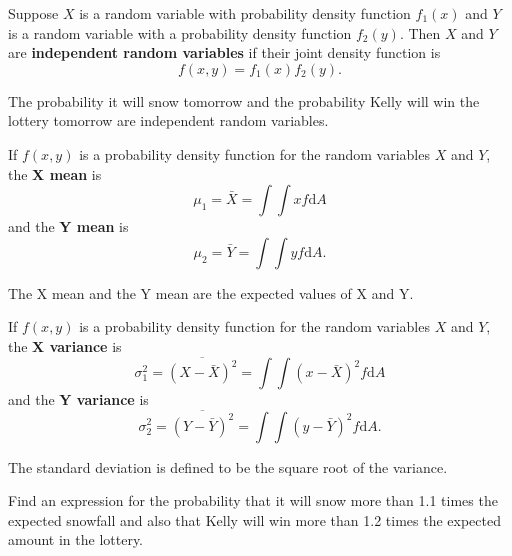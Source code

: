 \begin{definition} Suppose $X$ is a random variable with probability density function $f_1(x)$ and $Y$ is a random variable with a probability density function $f_2(y)$. Then $X$ and $Y$ are {\bf independent random variables} if their joint density function is
$$f(x,y)=f_1(x)f_2(y).$$
\end{definition}

\begin{example} The probability it will snow tomorrow and the probability Kelly will win the lottery tomorrow are independent random variables.
\end{example}

\begin{definition} If $f(x,y)$ is a probability density function for the random variables $X$ and $Y$, the {\bf X mean} is
$$\mu_1=\bar{X}=\int\int xf\mathrm{d}A$$
and the {\bf Y mean} is
$$\mu_2=\bar{Y}=\int\int yf\mathrm{d}A.$$
\end{definition}

\begin{remark} The X mean and the Y mean are the expected values of X and Y.
\end{remark}

\begin{definition} If $f(x,y)$ is a probability density function for the random variables $X$ and $Y$, the {\bf X variance} is
$$\sigma_1^2=\overline{(X-\bar{X})^2}=\int\int (x-\bar{X})^2f\mathrm{d}A$$
and the {\bf Y variance} is
$$\sigma_2^2=\overline{(Y-\bar{Y})^2}=\int\int (y-\bar{Y})^2f\mathrm{d}A.$$
\end{definition}

\begin{definition} The standard deviation is defined to be the square root of the variance.
\end{definition}

\begin{example} Find an expression for the probability that it will snow more than 1.1 times the expected snowfall and also that Kelly will win more than 1.2 times the expected amount in the lottery.
\end{example}

